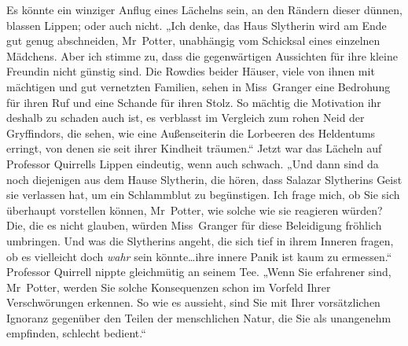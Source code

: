 Es könnte ein winziger Anflug eines Lächelns sein, an den Rändern dieser dünnen, blassen Lippen; oder auch nicht. „Ich denke, das Haus Slytherin wird am Ende gut genug abschneiden, Mr~Potter, unabhängig vom Schicksal eines einzelnen Mädchens. Aber ich stimme zu, dass die gegenwärtigen Aussichten für ihre kleine Freundin nicht günstig sind. Die Rowdies beider Häuser, viele von ihnen mit mächtigen und gut vernetzten Familien, sehen in Miss~Granger eine Bedrohung für ihren Ruf und eine Schande für ihren Stolz. So mächtig die Motivation ihr deshalb zu schaden auch ist, es verblasst im Vergleich zum rohen Neid der Gryffindors, die sehen, wie eine Außenseiterin die Lorbeeren des Heldentums erringt, von denen sie seit ihrer Kindheit träumen.“ Jetzt war das Lächeln auf Professor Quirrells Lippen eindeutig, wenn auch schwach. „Und dann sind da noch diejenigen aus dem Hause Slytherin, die hören, dass Salazar Slytherins Geist sie verlassen hat, um ein Schlammblut zu begünstigen. Ich frage mich, ob Sie sich überhaupt vorstellen können, Mr~Potter, wie solche wie sie reagieren würden? Die, die es nicht glauben, würden Miss~Granger für diese Beleidigung fröhlich umbringen. Und was die Slytherins angeht, die sich tief in ihrem Inneren fragen, ob es vielleicht doch \emph{wahr} sein könnte…ihre innere Panik ist kaum zu ermessen.“ Professor Quirrell nippte gleichmütig an seinem Tee. „Wenn Sie erfahrener sind, Mr~Potter, werden Sie solche Konsequenzen schon im Vorfeld Ihrer Verschwörungen erkennen. So wie es aussieht, sind Sie mit Ihrer vorsätzlichen Ignoranz gegenüber den Teilen der menschlichen Natur, die Sie als unangenehm empfinden, schlecht bedient.“


